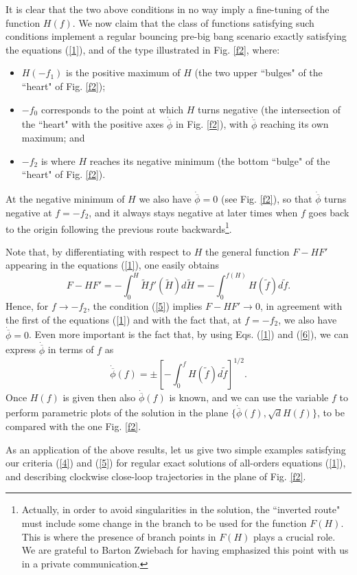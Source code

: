 \documentclass[a4paper,11pt]{article}
\def\beq{\begin{equation}}
\def\eeq{\end{equation}}
\def \ra {\rightarrow}
\def \ti {\widetilde}
\def \fb {\overline \phi}
\def \fbp {\dot{\fb}}
\begin{document}
It is clear that the two above conditions in no way imply a fine-tuning of the function $H(f)$. We now claim that the class of functions satisfying such conditions implement a regular bouncing pre-big bang scenario exactly satisfying the equations (\ref{1}), and of the type illustrated in Fig. \ref{f2}, where:
\begin{itemize}
\item{} 
$H(-f_1)$ is the positive maximum of $H$ (the two upper ``bulges"  of the ``heart" of Fig. \ref{f2});
\item{}
$-f_0$ corresponds to the point at which $H$ turns negative (the intersection  of the ``heart" with the positive axes  $\fbp$ in Fig. \ref{f2}), with $\fbp$ reaching its own maximum; and 
\item{}
$-f_2$ is where $H$ reaches its negative minimum (the bottom ``bulge" of the ``heart" of Fig. \ref{f2}).
\end{itemize}
At the negative minimum of $H$ we also have $\fbp=0$ (see Fig. \ref{f2}), so that $\fbp$ turns negative at $f=-f_2$, and it always stays negative at later times when $f$ goes back to the origin following the previous route backwards\footnote{Actually, in order to avoid singularities in the solution, the ``inverted route" must include some change in the branch to be used for the function $F(H)$. This is where the presence of branch points in $F(H)$ plays a crucial role. We are grateful to Barton Zwiebach for having emphasized this point with us in a private communication.}. 

Note that, by differentiating with respect to $H$ the general function $F-HF'$ appearing in the equations (\ref{1}), one easily obtains
\beq
F-H F'= -\int_0^H \ti H f'(\ti H) d\ti H = - \int_0^{f(H)} H(\ti f) d \ti f.
\label{6}
\eeq
Hence, for $f \ra - f_2$, the condition (\ref{5}) implies $F-HF' \ra 0$, in agreement with the first of the equations (\ref{1}) and with the fact that, at $f=-f_2$, we also have $\fbp=0$. Even more important is the fact that, by using Eqs. (\ref{1}) and (\ref{6}), we can express $\fbp$ in terms of $f$ as
\beq
\fbp (f) = \pm \left[ -\int_0^f H(\ti f) d \ti f  \right]^{1/2}.
\label{7}
\eeq
Once $H(f)$ is given then also $\fbp(f)$ is known, and we can use the variable $f$ to perform parametric plots of the solution in the plane $\{\fbp(f), \sqrt{d} H(f)\}$, to be compared with the one Fig. \ref{f2}. 

As an application of the above results, let us give two simple examples satisfying our criteria (\ref{4}) and (\ref{5}) for regular exact solutions of all-orders equations (\ref{1}), and describing clockwise close-loop trajectories in the plane of Fig. \ref{f2}. 
\end{document}
